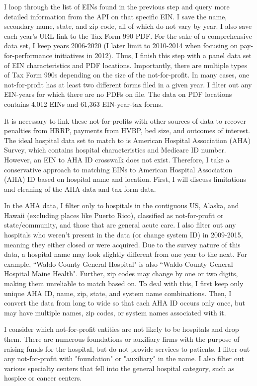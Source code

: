 \documentclass[12pt]{article}
\begin{document}
I loop through the list of EINs found in the previous step and query more detailed information from the API on that specific EIN. I save the name, secondary name, state, and zip code, all of which do not vary by year. I also save each year's URL link to the Tax Form 990 PDF. For the sake of a comprehensive data set, I keep years 2006-2020 (I later limit to 2010-2014 when focusing on pay-for-performance initiatives in 2012). Thus, I finish this step with a panel data set of EIN characteristics and PDF locations. Importantly, there are multiple types of Tax Form 990s depending on the size of the not-for-profit. In many cases, one not-for-profit has at least two different forms filed in a given year. I filter out any EIN-years for which there are no PDFs on file. The data on PDF locations contains 4,012 EINs and 61,363 EIN-year-tax forms.

It is necessary to link these not-for-profits with other sources of data to recover penalties from HRRP, payments from HVBP, bed size, and outcomes of interest. The ideal hospital data set to match to is American Hospital Association (AHA) Survey, which contains hospital characteristics and Medicare ID number. However, an EIN to AHA ID crosswalk does not exist. Therefore, I take a conservative approach to matching EINs to American Hospital Association (AHA) ID based on hospital name and location. First, I will discuss limitations and cleaning of the AHA data and tax form data. 

In the AHA data, I filter only to hospitals in the contiguous US, Alaska, and Hawaii (excluding places like Puerto Rico), classified as not-for-profit or state/community, and those that are general acute care. I also filter out any hospitals who weren't present in the data (or change system ID) in 2009-2015, meaning they either closed or were acquired. Due to the survey nature of this data, a hospital name may look slightly different from one year to the next. For example, ``Waldo County General Hospital" is also ``Waldo County General Hospital Maine Health". Further, zip codes may change by one or two digits, making them unreliable to match based on. To deal with this, I first keep only unique AHA ID, name, zip, state, and system name combinations. Then, I convert the data from long to wide so that each AHA ID occurs only once, but may have multiple names, zip codes, or system names associated with it.

I consider which not-for-profit entities are not likely to be hospitals and drop them. There are numerous foundations or auxiliary firms with the purpose of raising funds for the hospital, but do not provide services to patients. I filter out any not-for-profit with "foundation" or "auxiliary" in the name. I also filter out various specialty centers that fell into the general hospital category, such as hospice or cancer centers. 
\end{document}
